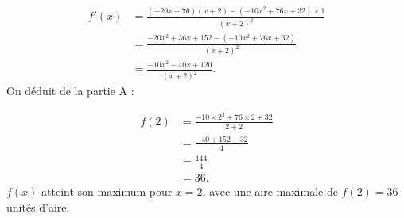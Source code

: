 \begin{align*}
f'(x) &= \frac{(-20x + 76)(x + 2) - (-10x^2 + 76x + 32) \times 1}{(x + 2)^2} \\
&= \frac{-20x^2 + 36x + 152 - (-10x^2 + 76x + 32)}{(x + 2)^2} \\
&= \frac{-10x^2 - 40x + 120}{(x + 2)^2}.
\end{align*}
On déduit de la partie A :
\begin{center}
\end{center}
\begin{align*}
f(2) &= \frac{-10 \times 2^2 + 76 \times 2 + 32}{2 + 2} \\
&= \frac{-40 + 152 + 32}{4} \\
&= \frac{144}{4} \\
&= 36.
\end{align*}
\( f(x) \) atteint son maximum pour \( x = 2 \), avec une aire maximale de \( f(2) = 36 \) unités d'aire.
